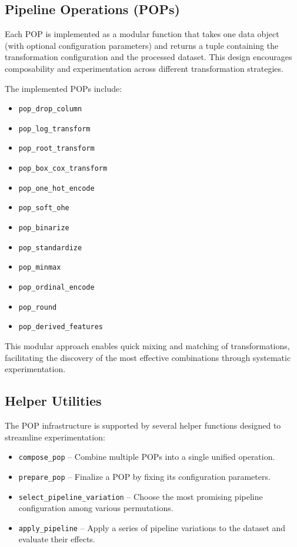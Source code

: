 \subsection{Pipeline Operations (POPs)}\label{subsec:pipeline-operations-(pops)}
Each POP is implemented as a modular function that takes one data object (with optional configuration parameters) and returns a tuple containing the transformation configuration and the processed dataset.
This design encourages composability and experimentation across different transformation strategies.

The implemented POPs include:
\begin{itemize}
    \item \texttt{pop\_drop\_column}
    \item \texttt{pop\_log\_transform}
    \item \texttt{pop\_root\_transform}
    \item \texttt{pop\_box\_cox\_transform}
    \item \texttt{pop\_one\_hot\_encode}
    \item \texttt{pop\_soft\_ohe}
    \item \texttt{pop\_binarize}
    \item \texttt{pop\_standardize}
    \item \texttt{pop\_minmax}
    \item \texttt{pop\_ordinal\_encode}
    \item \texttt{pop\_round}
    \item \texttt{pop\_derived\_features}
\end{itemize}

This modular approach enables quick mixing and matching of transformations, facilitating the discovery of the most effective combinations through systematic experimentation.

\subsection{Helper Utilities}\label{subsec:helper-utilities}
The POP infrastructure is supported by several helper functions designed to streamline experimentation:
\begin{itemize}
    \item \texttt{compose\_pop} – Combine multiple POPs into a single unified operation.
    \item \texttt{prepare\_pop} – Finalize a POP by fixing its configuration parameters.
    \item \texttt{select\_pipeline\_variation} – Choose the most promising pipeline configuration among various permutations.
    \item \texttt{apply\_pipeline} – Apply a series of pipeline variations to the dataset and evaluate their effects.
\end{itemize}

